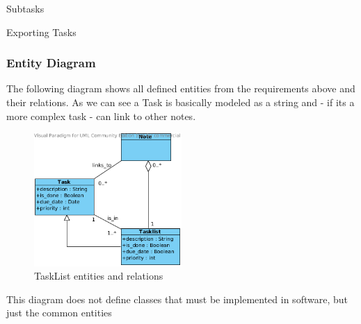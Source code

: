 \begin{requirement}{Subtasks}
	\label{requirements:functional:subtask}
\end{requirement}

\begin{requirement}{Exporting Tasks}
  \label{requirements:functional:export}
\end{requirement}


    \subsubsection{Entity Diagram}
    The following diagram shows all defined entities from the requirements above and their relations.
    As we can see a Task is basically modeled as a string and - if its a more complex task - can link to other notes.
    \begin{figure}[h]
	    \centering
        \includegraphics[width=0.5\textwidth]{graphics/entity_diagram.png}
        \caption{TaskList entities and relations}
        \label{entities_relations}
    \end{figure}
    
    This diagram does not define classes that must be implemented in software, but just the common entities



